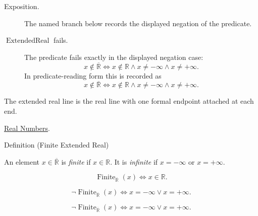 \begin{remark*}
\begin{description}
  \item[Exposition.] The named branch below records the displayed negation of the predicate.
  \item[\(\operatorname{ExtendedReal}\) fails.] The predicate fails exactly in the displayed negation case:
  \[
  x\notin\overline{\mathbb{R}}
  \Longleftrightarrow
  x\notin\mathbb{R}\land x\ne-\infty\land x\ne+\infty.
  \]
  In predicate-reading form this is recorded as
  \[
  x\notin\overline{\mathbb{R}}
  \Longleftrightarrow
  x\notin\mathbb{R}\land x\ne-\infty\land x\ne+\infty.
  \]
\end{description}
\end{remark*}
\begin{remark*}[Interpretation]
The extended real line is the real line with one formal endpoint attached at
each end.
\end{remark*}
\begin{dependencies}
\hyperref[def:reals]{Real Numbers}.
\end{dependencies}

\begin{definitionbox}{Definition (Finite Extended Real)}
\begin{definition}
\label{def:finite-extended-real}
An element $x\in\overline{\mathbb{R}}$ is \emph{finite} if $x\in\mathbb{R}$.
It is \emph{infinite} if $x=-\infty$ or $x=+\infty$.
\end{definition}
\end{definitionbox}
\begin{remark*}
\[
\operatorname{Finite}_{\overline{\mathbb{R}}}(x)
\Longleftrightarrow x\in\mathbb{R}.
\]
\end{remark*}
\begin{remark*}
\[
\neg\operatorname{Finite}_{\overline{\mathbb{R}}}(x)
\Longleftrightarrow x=-\infty\lor x=+\infty.
\]
\end{remark*}

\begin{remark*}
\[
\neg\operatorname{Finite}_{\overline{\mathbb{R}}}(x)
\Longleftrightarrow x=-\infty\lor x=+\infty.
\]
\end{remark*}

